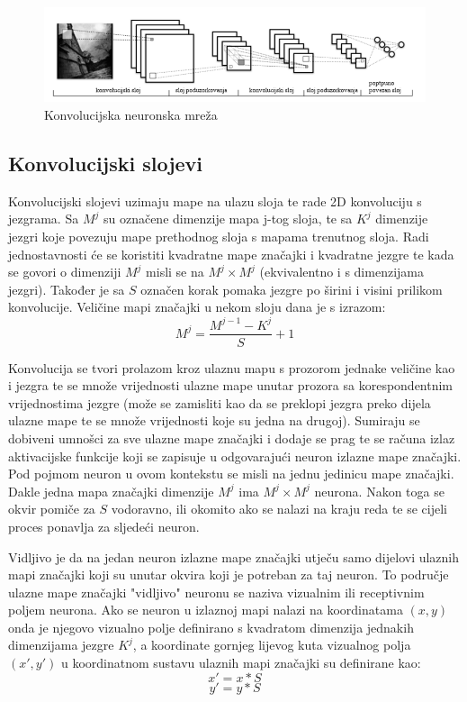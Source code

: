 \documentclass[times, utf8, zavrsni, numeric]{fer}
\begin{document}
\begin{figure}
    \centering
    \includegraphics[width=14cm]{img/konvolucijska-mreza.png}
    \caption{Konvolucijska neuronska mreža}
    \label{fig:konvolucijska-mreza}
\end{figure}

\subsection{Konvolucijski slojevi}
Konvolucijski slojevi uzimaju mape na ulazu sloja te rade 2D konvoluciju s jezgrama. Sa $M^j$ su označene dimenzije mapa j-tog sloja, te sa $K^j$ dimenzije jezgri koje povezuju mape prethodnog sloja s mapama trenutnog sloja. Radi jednostavnosti će se koristiti kvadratne mape značajki i kvadratne jezgre te kada se govori o dimenziji $M^j$ misli se na $M^j \times M^j$ (ekvivalentno i s dimenzijama jezgri). Također je sa $S$ označen korak pomaka jezgre po širini i visini prilikom konvolucije. Veličine mapi značajki u nekom sloju dana je s izrazom:
\begin{equation}
M^j = \frac{M^{j-1} - K^j}{S} + 1
\end{equation}

Konvolucija se tvori prolazom kroz ulaznu mapu s prozorom jednake veličine kao i jezgra te se množe vrijednosti ulazne mape unutar prozora sa korespondentnim vrijednostima jezgre (može se zamisliti kao da se preklopi jezgra preko dijela ulazne mape te se množe vrijednosti koje su jedna na drugoj). Sumiraju se dobiveni umnošci za sve ulazne mape značajki i dodaje se prag te se računa izlaz aktivacijske funkcije koji se zapisuje u odgovarajući neuron izlazne mape značajki. Pod pojmom neuron u ovom kontekstu se misli na jednu jedinicu mape značajki. Dakle jedna mapa značajki dimenzije $M^j$ ima $M^j \times M^j$ neurona. Nakon toga se okvir pomiče za $S$ vodoravno, ili okomito ako se nalazi na kraju reda te se cijeli proces ponavlja za sljedeći neuron.

Vidljivo je da na jedan neuron izlazne mape značajki utječu samo dijelovi ulaznih mapi značajki koji su unutar okvira koji je potreban za taj neuron. To područje ulazne mape značajki "vidljivo" neuronu se naziva vizualnim ili receptivnim poljem neurona. Ako se neuron u izlaznoj mapi nalazi na koordinatama $(x, y)$ onda je njegovo vizualno polje definirano s kvadratom dimenzija jednakih dimenzijama jezgre $K^j$, a koordinate gornjeg lijevog kuta vizualnog polja $(x', y')$ u koordinatnom sustavu ulaznih mapi značajki su definirane kao:
\begin{equation}
x' = x*S
\end{equation}
\begin{equation}
y' = y*S
\end{equation}
\end{document}
